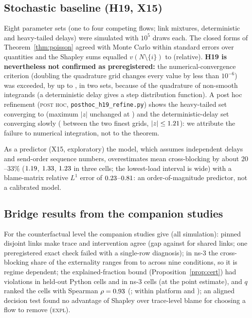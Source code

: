 \documentclass[11pt]{article}
\newcommand{\tagE}{\textsc{expl}}
\newcommand{\tagP}{\textsc{post hoc}}
\theoremstyle{definition}
\begin{document}
\subsection{Stochastic baseline (H19, X15)}\label{sec:val-poisson}
Eight parameter sets (one to four competing flows; link mixtures, deterministic and heavy-tailed delays) were simulated with $10^5$ draws each. The closed forms of Theorem~\ref{thm:poisson} agreed with Monte Carlo within \FvMaxZ{} standard errors over \FvNQuant{} quantities and the Shapley sums equalled $v(N\setminus\{i\})$ to \FvEffGap{} (relative). \textbf{H19 is nevertheless not confirmed as preregistered:} the numerical-convergence criterion (doubling the quadrature grid changes every value by less than $10^{-6}$) was exceeded, by up to \FvQuadMax{}, in two sets, because of the quadrature of non-smooth integrands (a deterministic delay gives a step distribution function). A post hoc refinement (\tagP{}, \texttt{posthoc\_h19\_refine.py}) shows the heavy-tailed set converging to \FvRefDriftS{} (maximum $|z|$ unchanged at \FvRefZS{}) and the deterministic-delay set converging slowly (\FvRefDriftP{} between the two finest grids, $|z|\le1.21{}$): we attribute the failure to numerical integration, not to the theorem.
\begin{table}[h]
\centering\small

\caption{X15 (\tagE{}): a-priori prediction in the Python simulator (S4 FIFO) from flow rates and the empirical delay law of calibration seeds, against observed cross-blocking on held-out seeds; blame error is the relative $L^1$ error of the 12-entry blame matrix.}
\end{table}
As a predictor (X15, exploratory) the model, which assumes independent delays and send-order sequence numbers, overestimates mean cross-blocking by about $20$--$33\%$ ($1.19{}$, $1.33{}$, $1.23{}$ in three cells; the lowest-load interval is wide) with a blame-matrix relative $L^1$ error of $0.23{}$--$0.81{}$: an order-of-magnitude predictor, not a calibrated model.

\subsection{Bridge results from the companion studies}
For the counterfactual level the companion studies give (all simulation): pinned disjoint links make trace and intervention agree (gap \TenGapPinned{} against \TenGapShared{} for shared links; one preregistered exact check failed with a single-row diagnosis); in ns-3 the cross-blocking share of the externality ranges from \ElevenMin{} to \ElevenMax{} across nine conditions, so it is regime dependent; the explained-fraction bound (Proposition~\ref{prop:cert}) had violations in \FourPyViol{} held-out Python cells and in \FourNsViol{} ns-3 cells (at the point estimate), and $q$ ranked the cells with Spearman $\rho=0.93$ (\FourRhoCI{}; within platform \FourRhoPy{} and \FourRhoNs{}); an aligned decision test found no advantage of Shapley over trace-level blame for choosing a flow to remove (\tagE{}).
\end{document}
